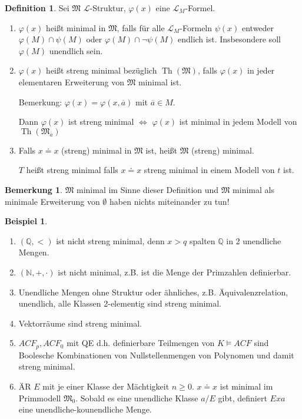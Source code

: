 \documentclass[12pt,parskip=full]{scrartcl}
\newcommand{\setN}{\mathbb{N}}
\newcommand{\setQ}{\mathbb{Q}}
\theoremstyle{definition}
\newtheorem{definition}[theorem]{Definition}
\newtheorem{example}[theorem]{Beispiel}
\newtheorem{remark}[theorem]{Bemerkung}
\begin{document}
 	\begin{definition}
 		Sei $\mathfrak{M}$ $\mathcal{L}$-Struktur, $\varphi(x)$ eine $\mathcal{L}_M$-Formel.
 		\begin{enumerate}
 			\item $\varphi(x)$ heißt minimal in $\mathfrak{M}$, falls für alle $\mathcal{L}_M$-Formeln $\psi(x)$ entweder $\varphi(M) \cap \psi(M)$ oder $\varphi(M) \cap \lnot \psi(M)$ endlich ist. Insbesondere soll $\varphi(M)$ unendlich sein.
 			\item $\varphi(x)$ heißt streng minimal bezüglich $\operatorname{Th}(\mathfrak{M})$, falls $\varphi(x)$ in jeder elementaren Erweiterung von $\mathfrak{M}$ minimal ist.
 			
 			Bemerkung: $\varphi(x) = \varphi(x, \overline{a})$ mit $\overline{a} \in M$.
 				
 			Dann $\varphi(x)$ ist streng minimal $\Leftrightarrow$ $\varphi(x)$ ist minimal in jedem Modell von $\operatorname{Th}(\mathfrak{M}_{\overline{a}})$
 			
 			\item Falls $x \doteq x$ (streng) minimal in $\mathfrak{M}$ ist, heißt $\mathfrak{M}$ (streng) minimal.
 			
 			$T$ heißt streng minimal falls $x \doteq x$ streng minimal in einem Modell von $t$ ist.
 		\end{enumerate}
 	\end{definition}
 
 	\begin{remark}
 		$\mathfrak{M}$ minimal im Sinne dieser Definition und $\mathfrak{M}$ minimal als minimale Erweiterung von $\emptyset$ haben nichts miteinander zu tun!
 	\end{remark}
 
 	\begin{example}
 		\begin{enumerate}
 			\item $(\setQ, <)$ ist nicht streng minimal, denn $x > q$ spalten $\setQ$ in 2 unendliche Mengen.
 			\item $(\setN, +, \cdot)$ ist nicht minimal, z.B. ist die Menge der Primzahlen definierbar.
 			\item Unendliche Mengen ohne Struktur oder ähnliches, z.B. Äquivalenzrelation, unendlich, alle Klassen 2-elementig sind streng minimal.
 			\item Vektorräume sind streng minimal.
 			\item $ACF_p, ACF_0$ mit QE d.h. definierbare Teilmengen von $K \models ACF$ sind Boolesche Kombinationen von Nullstellenmengen von Polynomen und damit streng minimal.
 			\item ÄR $E$ mit je einer Klasse der Mächtigkeit $n \geq 0$. $x \doteq x$ ist minimal im Primmodell $\mathfrak{M}_0$. Sobald es eine unendliche Klasse $a/E$ gibt, definiert $E x a$ eine unendliche-kounendliche Menge.
 		\end{enumerate}
 	\end{example}
 
\end{document}
